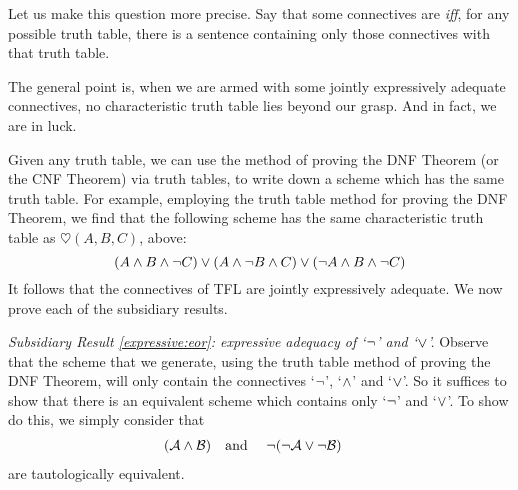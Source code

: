 Let us make this question more precise. Say that some connectives are  \emph{iff}, for any possible truth table, there is a sentence containing only those connectives with that truth table.


The general point is, when we are armed with some jointly expressively adequate connectives, no characteristic truth table lies beyond our grasp. And in fact, we are in luck.

Given any truth table, we can use the method of proving the DNF Theorem (or the CNF Theorem) via truth tables, to write down a scheme which has the same truth table. For example, employing the truth table method for proving the DNF Theorem, we find that the following scheme has the same characteristic truth table as $\heartsuit(A,B,C)$, above:
		$$(A \wedge B \wedge \neg C) \vee (A \wedge \neg B \wedge C) \vee (\neg A \wedge B \wedge \neg C)$$			
It follows that the connectives of TFL are jointly expressively adequate. We now prove each of the subsidiary results.
	
\emph{Subsidiary Result \ref{expressive:eor}: expressive adequacy of `$\neg$' and `$\vee$'.} Observe that the scheme that we generate, using the truth table method of proving the DNF Theorem, will only contain the connectives `$\neg$', `$\wedge$' and `$\vee$'. So it suffices to show that there is an equivalent scheme which contains only `$\neg$' and `$\vee$'. To show do this, we simply consider that
		\begin{align*}
		(\mathcal{A} \wedge \mathcal{B}) & \text{\quad and \quad} \neg(\neg \mathcal{A} \vee\neg \mathcal{B})
		\end{align*}
		are tautologically equivalent.


